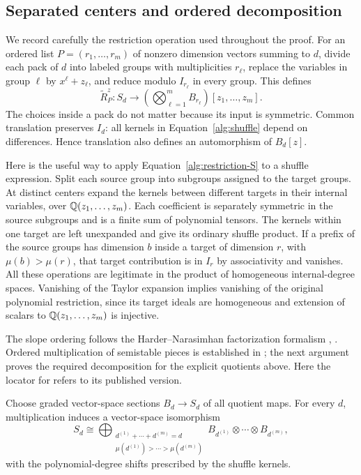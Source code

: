 \subsection{Separated centers and ordered decomposition}

We record carefully the restriction operation used throughout the
proof.  For an ordered list $P=(r_1,\ldots,r_m)$ of nonzero dimension
vectors summing to $d$, divide each pack of $d$ into labeled groups
with multiplicities $r_\ell$, replace the variables in group $\ell$
by $x^\ell+z_\ell$, and reduce modulo $I_{r_\ell}$ in every group.
This defines
\begin{equation}\label{alg:restriction-S}
 \widetilde R_P^z:S_d\longrightarrow
       \left(\bigotimes_{\ell=1}^m B_{r_\ell}\right)
          [z_1,\ldots,z_m].
\end{equation}
The choices inside a pack do not matter because its input is
symmetric.  Common translation preserves $I_d$: all kernels in
Equation~\eqref{alg:shuffle} depend on differences.  Hence translation
also defines an automorphism of $B_d[z]$.

Here is the useful way to apply Equation~\eqref{alg:restriction-S} to
a shuffle expression.  Split each source group into subgroups assigned
to the target groups.  At distinct centers expand the kernels between
different targets in their internal variables, over
$\mathbb Q(z_1,\ldots,z_m)$.  Each coefficient is separately symmetric in
the source subgroups and is a finite sum of polynomial tensors.
The kernels within one target are left unexpanded and give its
ordinary shuffle product.  If a prefix of the source groups has
dimension $b$ inside a target of dimension $r$, with
$\mu(b)>\mu(r)$, that target contribution is in $I_r$ by
associativity and vanishes.  All these operations are legitimate in
the product of homogeneous internal-degree spaces.  Vanishing of the
Taylor expansion implies vanishing of the original polynomial
restriction, since its target ideals are homogeneous and extension of
scalars to $\mathbb Q(z_1,\ldots,z_m)$ is injective.

The slope ordering follows the Harder--Narasimhan factorization
formalism \cite[Propositions~4.8 and 4.12]{Rei03},
\cite[Sections~5.2--5.3]{KS11}.  Ordered multiplication of semistable
pieces is established in \cite[Theorem~6.2]{FR18}; the next argument
proves the required decomposition for the explicit quotients above.
Here the locator for \cite{FR18} refers to its published version.

\begin{lemma}\label{alg:ordered}
Choose graded vector-space sections $B_d\to S_d$ of all quotient
maps.  For every $d$, multiplication induces a vector-space
isomorphism
\begin{equation}\label{alg:ordered-sum}
 S_d\cong
 \bigoplus_{\substack{d^{(1)}+\cdots+d^{(m)}=d\\
       \mu(d^{(1)})>\cdots>\mu(d^{(m)})}}
 B_{d^{(1)}}\otimes\cdots\otimes B_{d^{(m)}},
\end{equation}
with the polynomial-degree shifts prescribed by the shuffle kernels.
\end{lemma}

